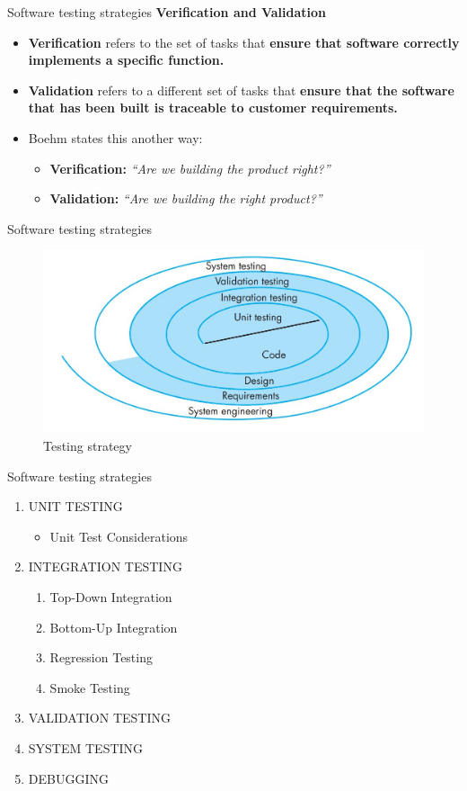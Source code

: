 \documentclass{beamer}
\begin{document}
\begin{frame}{Software testing strategies}
	\textbf{Verification and Validation}
	\begin{itemize}
		\item \textbf{Verification} refers to the set of tasks that\textbf{ ensure that software correctly implements a specific function. }
		\item \textbf{Validation} refers to a different set of tasks that \textbf{ensure that the software that has     been built is traceable to customer requirements. }
		\item Boehm states this another way:
		\begin{itemize}
			\item \textbf{Verification:} \emph{ “Are we building the product right?”}
			\item \textbf{Validation:} \emph{ “Are we building the right product?”}
		\end{itemize}
	\end{itemize}
\end{frame}
\begin{frame}{Software testing strategies}
		\begin{figure}
	\includegraphics[scale=.5]{img/m3_23}
	\caption{Testing 
		strategy}
\end{figure}
\end{frame}
\begin{frame}{Software testing strategies}
\begin{enumerate}
	\item UNIT TESTING
	\begin{itemize}
		\item 	Unit Test Considerations
	\end{itemize}
	\item INTEGRATION TESTING
	\begin{enumerate}[i]
		\item Top-Down Integration
		\item Bottom-Up Integration
		\item Regression Testing
		\item Smoke Testing
	\end{enumerate}
	\item VALIDATION TESTING
	\item SYSTEM TESTING
	\item DEBUGGING
\end{enumerate}
\end{frame}
\end{document}
